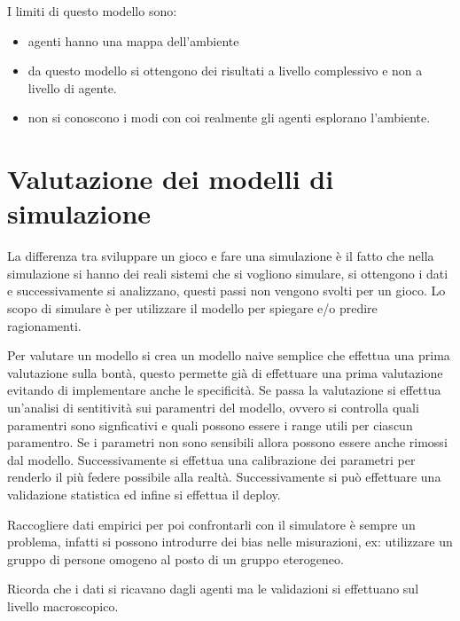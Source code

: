 I limiti di questo modello sono:
\begin{itemize}
    \item agenti hanno una mappa dell'ambiente
    \item da questo modello si ottengono dei risultati a livello complessivo e non 
    a livello di agente.
    \item non si conoscono i modi con coi realmente gli agenti esplorano l'ambiente.
\end{itemize}   

\section{Valutazione dei modelli di simulazione}
La differenza tra sviluppare un gioco e fare una simulazione è il fatto che 
nella simulazione si hanno dei reali sistemi che si vogliono simulare, si ottengono
i dati e successivamente si analizzano, questi passi non vengono svolti per un gioco.
Lo scopo di simulare è per utilizzare il modello per spiegare e/o predire ragionamenti.

Per valutare un modello si crea un modello naive semplice che effettua una prima 
valutazione sulla bontà, questo permette già di effettuare una prima valutazione 
evitando di implementare anche le specificità. Se passa la valutazione si 
effettua un'analisi di sentitività sui paramentri del modello, ovvero si controlla quali paramentri
sono signficativi e quali possono essere i range utili per ciascun paramentro.
Se i parametri non sono sensibili allora possono essere anche rimossi dal modello.
Successivamente si effettua una calibrazione dei parametri per renderlo il più federe 
possibile alla realtà. Successivamente si può effettuare una validazione statistica 
ed infine si effettua il deploy.

Raccogliere dati empirici per poi confrontarli con il simulatore è sempre un problema,
infatti si possono introdurre dei bias nelle misurazioni, ex: utilizzare un gruppo 
di persone omogeno al posto di un gruppo eterogeneo.

Ricorda che i dati si ricavano dagli agenti ma le validazioni si effettuano sul
livello macroscopico.